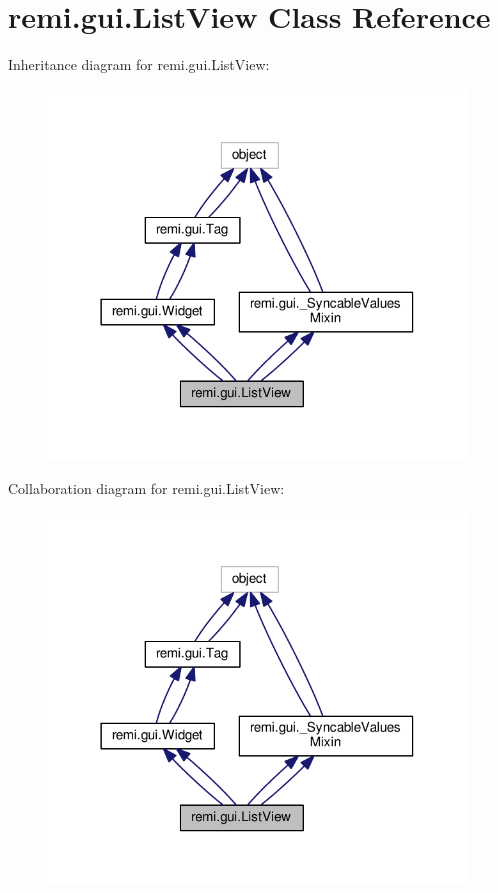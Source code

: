 \hypertarget{classremi_1_1gui_1_1ListView}{}\section{remi.\+gui.\+List\+View Class Reference}
\label{classremi_1_1gui_1_1ListView}


Inheritance diagram for remi.\+gui.\+List\+View\+:
\nopagebreak
\begin{figure}[H]
\begin{center}
\leavevmode
\includegraphics[width=314pt]{d3/de5/classremi_1_1gui_1_1ListView__inherit__graph}
\end{center}
\end{figure}


Collaboration diagram for remi.\+gui.\+List\+View\+:
\nopagebreak
\begin{figure}[H]
\begin{center}
\leavevmode
\includegraphics[width=314pt]{d6/d2b/classremi_1_1gui_1_1ListView__coll__graph}
\end{center}
\end{figure}
